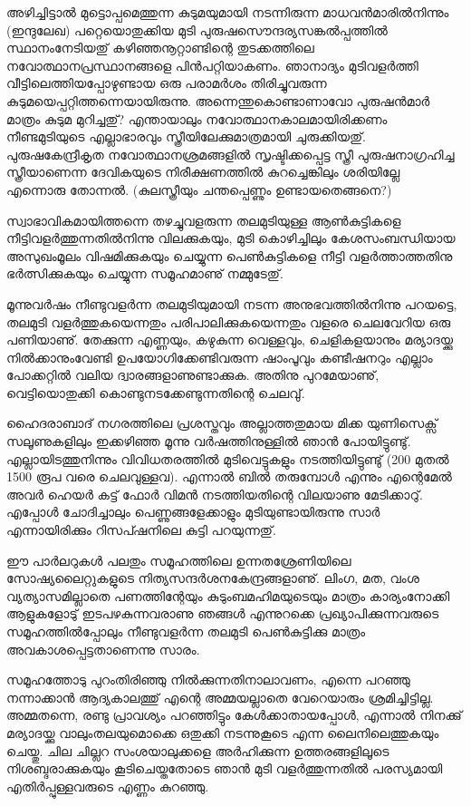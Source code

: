 അഴിച്ചിട്ടാല്‍ മുട്ടൊപ്പമെത്തുന്ന കുടുമയുമായി നടന്നിരുന്ന മാധവന്‍മാരില്‍നിന്നും (ഇന്ദുലേഖ) 
പറ്റെയൊതുക്കിയ മുടി പുരുഷസൌന്ദര്യസങ്കല്‍പ്പത്തില്‍ സ്ഥാനംനേടിയതു് കഴിഞ്ഞനൂറ്റാണ്ടിന്റെ തുടക്കത്തിലെ 
നവോത്ഥാനപ്രസ്ഥാനങ്ങളെ പിന്‍പറ്റിയാകണം. ഞാനാദ്യം മുടിവളര്‍ത്തി വീട്ടിലെത്തിയപ്പോഴുണ്ടായ ഒരു പരാമര്‍ശം തിരിച്ചുവരുന്ന കുടുമയെപ്പറ്റിത്തന്നെയായിരുന്നു. അന്നെന്തുകൊണ്ടാണാവോ പുരുഷന്‍മാര്‍ മാത്രം കുടുമ മുറിച്ചതു്? എന്തായാലും 
നവോത്ഥാനകാലമായിരിക്കണം നീണ്ടമുടിയുടെ എല്ലാഭാരവും സ്ത്രീയിലേക്കുമാത്രമായി ചുരുക്കിയതു്.  
പുരുഷകേന്ദ്രീകൃത നവോത്ഥാനശ്രമങ്ങളില്‍ സൃഷ്ടിക്കപ്പെട്ട സ്ത്രീ പുരുഷനാഗ്രഹിച്ച സ്ത്രീയാണെന്ന ദേവികയുടെ നിരീക്ഷണത്തില്‍ 
കുറച്ചെങ്കിലും ശരിയില്ലേ എന്നൊരു തോന്നല്‍. (കുലസ്ത്രീയും ചന്തപ്പെണ്ണും ഉണ്ടായതെങ്ങനെ?)

സ്വാഭാവികമായിത്തന്നെ തഴച്ചുവളരുന്ന തലമുടിയുള്ള ആണ്‍കുട്ടികളെ നീട്ടിവളര്‍ത്തുന്നതില്‍നിന്നു വിലക്കുകയും, മുടി 
കൊഴിച്ചിലും കേശസംബന്ധിയായ അസുഖംമൂലം വിഷമിക്കുകയും ചെയ്യുന്ന പെണ്‍കുട്ടികളെ നീട്ടി വളര്‍ത്താത്തതിനു 
ഭര്‍ത്സിക്കുകയും ചെയ്യുന്ന സമൂഹമാണു് നമ്മുടേതു്.

മൂന്നുവര്‍ഷം നീണ്ടുവളര്‍ന്ന തലമുടിയുമായി നടന്ന അനുഭവത്തില്‍നിന്നു പറയട്ടെ, തലമുടി വളര്‍ത്തുകയെന്നതും 
പരിപാലിക്കുകയെന്നതും വളരെ ചെലവേറിയ ഒരു പണിയാണു്. തേക്കുന്ന എണ്ണയും, കഴുകുന്ന വെള്ളവും, ചെളികളയാനും 
മര്യാദയ്ക്കു നില്‍ക്കാനുംവേണ്ടി ഉപയോഗിക്കേണ്ടിവരുന്ന ഷാംപൂവും കണ്ടീഷനറും എല്ലാം പോക്കറ്റില്‍ വലിയ 
ദ്വാരങ്ങളാണുണ്ടാക്കുക. അതിനു പുറമേയാണു്, വെട്ടിയൊതുക്കി കൊണ്ടുനടക്കേണ്ടുന്നതിന്റെ ചെലവു്.

ഹൈദരാബാദ് നഗരത്തിലെ പ്രശസ്തവും അല്ലാത്തതുമായ മിക്ക യുണിസെക്സ് സലൂണുകളിലും ഇക്കഴിഞ്ഞ മൂന്നു 
വര്‍ഷത്തിനുള്ളില്‍ ഞാന്‍ പോയിട്ടുണ്ടു്. എല്ലായിടത്തുനിന്നും വിവിധതരത്തില്‍ മുടിവെട്ടുകളും നടത്തിയിട്ടുണ്ടു് (200 
‌മുതല്‍ 1500 രൂപ വരെ ചെലവുള്ളവ). എന്നാല്‍ ബില്‍ തരുമ്പോള്‍ എന്നും എന്റെമേല്‍ അവര്‍ ഹെയര്‍ കട്ട് ഫോര്‍ 
വിമന്‍ നടത്തിയതിന്റെ വിലയാണു മേടിക്കാറു്. എപ്പോള്‍ ചോദിച്ചാലും പെണ്ണുങ്ങളേക്കാളും മുടിയുണ്ടായിരുന്നു സാര്‍ 
എന്നായിരിക്കും റിസപ്ഷനിലെ കുട്ടി പറയുന്നതു്.

ഈ പാര്‍ലറുകള്‍ പലതും സമൂഹത്തിലെ ഉന്നതശ്രേണിയിലെ സോഷ്യലൈറ്റുകളുടെ നിത്യസന്ദര്‍ശനകേന്ദ്രങ്ങളാണു്. 
ലിംഗ, മത, വംശ വ്യത്യാസമില്ലാതെ പണത്തിന്റേയും കുടുംബമഹിമയുടെയും മാത്രം കാര്യംനോക്കി ആളുകളോടു് 
ഇടപഴകുന്നവരാണു ഞങ്ങള്‍ എന്നുറക്കെ പ്രഖ്യാപിക്കുന്നവരുടെ സമൂഹത്തില്‍പ്പോലും നീണ്ടുവളര്‍ന്ന തലമുടി പെണ്‍കുട്ടിക്കു 
മാത്രം അവകാശപ്പെട്ടതാണെന്നു സാരം.

സമൂഹത്തോടു പുറംതിരിഞ്ഞു നില്‍ക്കുന്നതിനാലാവണം, എന്നെ പറഞ്ഞു നന്നാക്കാന്‍ ആദ്യകാലത്തു് എന്റെ 
അമ്മയല്ലാതെ വേറെയാരും ശ്രമിച്ചിട്ടില്ല. അമ്മതന്നെ, രണ്ടു പ്രാവശ്യം പറഞ്ഞിട്ടും കേള്‍ക്കാതായപ്പോള്‍, എന്നാല്‍ 
നിനക്കു് മര്യാദയ്ക്കു വാലുംതലയുമൊക്കെ ഒതുക്കി നടന്നുകൂടെ എന്ന ലൈനിലെത്തുകയും ചെയ്തു. ചില ചില്ലറ 
സംശയാലുക്കളെ അര്‍ഹിക്കുന്ന ഉത്തരങ്ങളിലൂടെ നിശബ്ദരാക്കുകയും കൂടിചെയ്തതോടെ ഞാന്‍ മുടി വളര്‍ത്തുന്നതില്‍ 
പരസ്യമായി എതിര്‍പ്പുള്ളവരുടെ എണ്ണം കുറഞ്ഞു.

